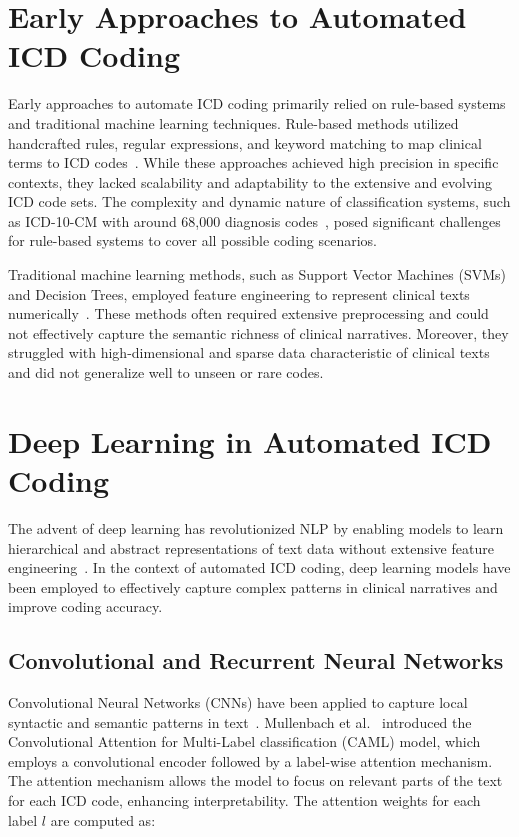 \documentclass[12pt,a4paper]{report}
\begin{document}
\section{Early Approaches to Automated ICD Coding}

Early approaches to automate ICD coding primarily relied on rule-based systems and traditional machine learning techniques. Rule-based methods utilized handcrafted rules, regular expressions, and keyword matching to map clinical terms to ICD codes~\cite{farkas2008automatic, scheurwegs2017data}. While these approaches achieved high precision in specific contexts, they lacked scalability and adaptability to the extensive and evolving ICD code sets. The complexity and dynamic nature of classification systems, such as ICD-10-CM with around 68,000 diagnosis codes~\cite{dong2022automated}, posed significant challenges for rule-based systems to cover all possible coding scenarios.

Traditional machine learning methods, such as Support Vector Machines (SVMs) and Decision Trees, employed feature engineering to represent clinical texts numerically~\cite{perotte2014diagnosis}. These methods often required extensive preprocessing and could not effectively capture the semantic richness of clinical narratives. Moreover, they struggled with high-dimensional and sparse data characteristic of clinical texts and did not generalize well to unseen or rare codes.

\section{Deep Learning in Automated ICD Coding}

The advent of deep learning has revolutionized NLP by enabling models to learn hierarchical and abstract representations of text data without extensive feature engineering~\cite{lecun2015deep}. In the context of automated ICD coding, deep learning models have been employed to effectively capture complex patterns in clinical narratives and improve coding accuracy.

\subsection{Convolutional and Recurrent Neural Networks}

Convolutional Neural Networks (CNNs) have been applied to capture local syntactic and semantic patterns in text~\cite{kim2014convolutional}. Mullenbach et al.~\cite{mullenbach2018explainable} introduced the Convolutional Attention for Multi-Label classification (CAML) model, which employs a convolutional encoder followed by a label-wise attention mechanism. The attention mechanism allows the model to focus on relevant parts of the text for each ICD code, enhancing interpretability. The attention weights for each label $l$ are computed as:
\end{document}
